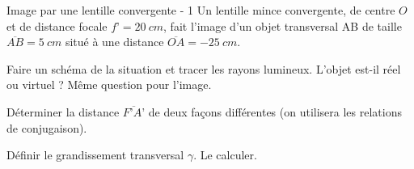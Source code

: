
\begin{exo}[PCSI]{Image par une lentille convergente - 1}
Un lentille mince convergente, de centre $O$ et de distance focale $f’=\SI{20}{cm}$, fait l’image d’un objet transversal AB de taille $\overline{AB}=\SI{5}{cm}$ situé à une distance $\overline{OA}=-\SI{25}{cm}$.
\begin{quest}
\item Faire un schéma de la situation et tracer les rayons lumineux. L’objet est-il réel ou virtuel ? Même question pour l’image.
\item Déterminer la distance $\overline{F’A’}$ de deux façons différentes (on utilisera les relations de conjugaison).
\item Définir le grandissement transversal $\gamma$. Le calculer.
\end{quest}

\end{exo}

